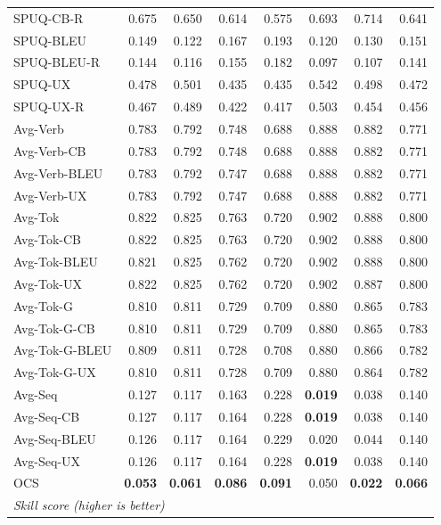 {\begin{longtable}{@{}lrrrrrrr@{}}
SPUQ-CB-R & 0.675 & 0.650 & 0.614 & 0.575 & 0.693 & 0.714 & 0.641 \\
SPUQ-BLEU & 0.149 & 0.122 & 0.167 & 0.193 & 0.120 & 0.130 & 0.151 \\
SPUQ-BLEU-R & 0.144 & 0.116 & 0.155 & 0.182 & 0.097 & 0.107 & 0.141 \\
SPUQ-UX & 0.478 & 0.501 & 0.435 & 0.435 & 0.542 & 0.498 & 0.472 \\
SPUQ-UX-R & 0.467 & 0.489 & 0.422 & 0.417 & 0.503 & 0.454 & 0.456 \\
\addlinespace
Avg-Verb & 0.783 & 0.792 & 0.748 & 0.688 & 0.888 & 0.882 & 0.771 \\
Avg-Verb-CB & 0.783 & 0.792 & 0.748 & 0.688 & 0.888 & 0.882 & 0.771 \\
Avg-Verb-BLEU & 0.783 & 0.792 & 0.747 & 0.688 & 0.888 & 0.882 & 0.771 \\
Avg-Verb-UX & 0.783 & 0.792 & 0.747 & 0.688 & 0.888 & 0.882 & 0.771 \\
\addlinespace
Avg-Tok & 0.822 & 0.825 & 0.763 & 0.720 & 0.902 & 0.888 & 0.800 \\
Avg-Tok-CB & 0.822 & 0.825 & 0.763 & 0.720 & 0.902 & 0.888 & 0.800 \\
Avg-Tok-BLEU & 0.821 & 0.825 & 0.762 & 0.720 & 0.902 & 0.888 & 0.800 \\
Avg-Tok-UX & 0.822 & 0.825 & 0.762 & 0.720 & 0.902 & 0.887 & 0.800 \\
Avg-Tok-G & 0.810 & 0.811 & 0.729 & 0.709 & 0.880 & 0.865 & 0.783 \\
Avg-Tok-G-CB & 0.810 & 0.811 & 0.729 & 0.709 & 0.880 & 0.865 & 0.783 \\
Avg-Tok-G-BLEU & 0.809 & 0.811 & 0.728 & 0.708 & 0.880 & 0.866 & 0.782 \\
Avg-Tok-G-UX & 0.810 & 0.811 & 0.728 & 0.709 & 0.880 & 0.864 & 0.782 \\
\addlinespace
Avg-Seq & 0.127 & 0.117 & 0.163 & 0.228 & \textbf{0.019} & 0.038 & 0.140 \\
Avg-Seq-CB & 0.127 & 0.117 & 0.164 & 0.228 & \textbf{0.019} & 0.038 & 0.140 \\
Avg-Seq-BLEU & 0.126 & 0.117 & 0.164 & 0.229 & 0.020 & 0.044 & 0.140 \\
Avg-Seq-UX & 0.126 & 0.117 & 0.164 & 0.228 & \textbf{0.019} & 0.038 & 0.140 \\
\addlinespace
OCS & \textbf{0.053} & \textbf{0.061} & \textbf{0.086} & \textbf{0.091} & 0.050 & \textbf{0.022} & \textbf{0.066} \\
\midrule
\multicolumn{8}{l}{\textit{Skill score (higher is better)}} \\

\end{longtable}}

